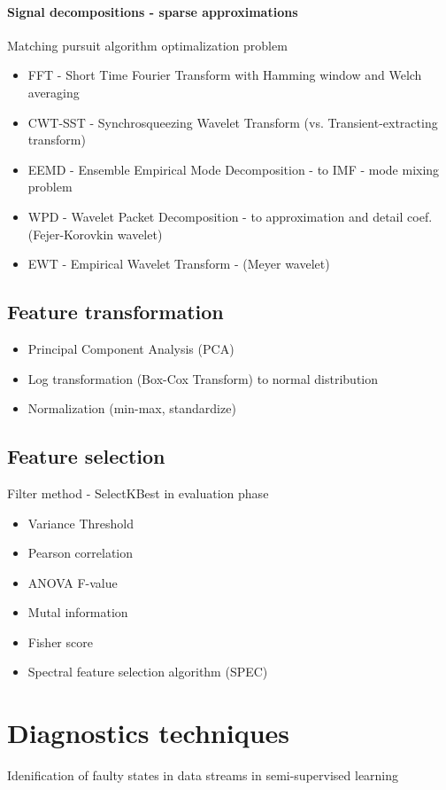 \paragraph{Signal decompositions - sparse approximations}
Matching pursuit algorithm optimalization problem
\begin{itemize}
\item FFT - Short Time Fourier Transform with Hamming window and Welch averaging
\item CWT-SST - Synchrosqueezing Wavelet Transform (vs. Transient-extracting transform)
\item EEMD - Ensemble Empirical Mode Decomposition - to IMF - mode mixing problem
\item WPD - Wavelet Packet Decomposition  - to approximation and detail coef. (Fejer-Korovkin wavelet)
\item EWT - Empirical Wavelet Transform - (Meyer wavelet) 
\end{itemize}


\subsection{Feature transformation}
\begin{itemize}
\item Principal Component Analysis (PCA)
\item Log transformation (Box-Cox Transform) to normal distribution
\item Normalization (min-max, standardize) 
\end{itemize}

\subsection{Feature selection}
Filter method - SelectKBest  in evaluation phase
\begin{itemize}
\item Variance Threshold
\item Pearson correlation
\item ANOVA F-value
\item Mutal information
\item Fisher score
\item Spectral feature selection algorithm (SPEC)
\end{itemize}

\section{Diagnostics techniques}
Idenification of faulty states in data streams in semi-supervised learning

